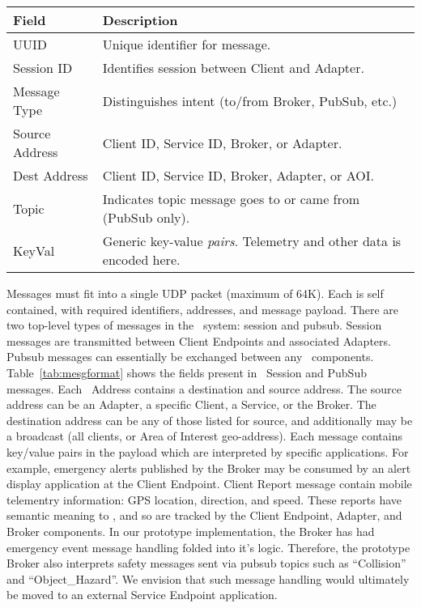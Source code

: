 \begin{table*}[ht]
  \centering
  \begin{tabular}{| l | l |}
    \hline
    \textbf{Field} & \textbf{Description} \\ \hline \hline
    UUID & Unique identifier for message. \\ \hline
    Session ID & Identifies session between Client and Adapter. \\ \hline
    Message Type & Distinguishes intent (to/from Broker, PubSub, etc.) \\ \hline
    Source Address & Client ID, Service ID, Broker, or Adapter. \\ \hline
    Dest Address & Client ID, Service ID, Broker, Adapter, or AOI. \\ \hline
    Topic & Indicates topic message goes to or came from (PubSub only). \\ \hline
    KeyVal & Generic key-value \emph{pairs}. Telemetry and other data is encoded here. \\
    \hline
  \end{tabular}
  \label{tab:mesgformat}
  \caption{Message fields found inside individual \name~messages.}
\end{table*}

Messages must fit into a single UDP packet (maximum of 64K).  Each is
self contained, with required identifiers, addresses, and message
payload.  There are two top-level types of messages in the \name~system: 
session and pubsub.  Session messages are transmitted between
Client Endpoints and associated Adapters.  Pubsub messages can
essentially be exchanged between any \name~components.
Table~\ref{tab:mesgformat} shows the fields present in \name~Session
and PubSub messages. Each \name~Address contains a destination and
source address.  The source address can be an Adapter, a specific
Client, a Service, or the Broker.  The destination address can be any
of those listed for source, and additionally may be a broadcast (all
clients, or Area of Interest geo-address).  Each message contains
key/value pairs in the payload which are interpreted by specific
applications. For example, emergency alerts published by the Broker
may be consumed by an alert display application at the Client
Endpoint.  Client Report message contain mobile telementry
information: GPS location, direction, and speed. These reports have
semantic meaning to \name, and so are tracked by the Client
Endpoint, Adapter, and Broker components.  In our prototype
implementation, the Broker has had emergency event message handling
folded into it's logic.  Therefore, the prototype Broker also
interprets safety messages sent via pubsub topics such as
``Collision'' and ``Object\_Hazard''. We envision that such message
handling would ultimately be moved to an external Service Endpoint
application.

